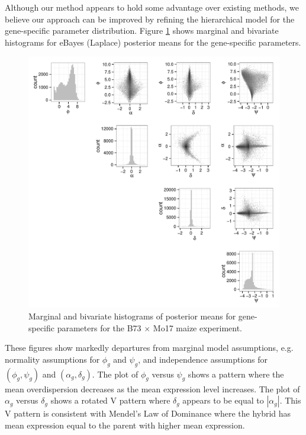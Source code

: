 \documentclass[useAMS,usenatbib,referee]{biom}
\begin{document}
Although our method appears to hold some advantage over existing methods, we believe our approach can be improved by refining the hierarchical model for the gene-specific parameter distribution. Figure \ref{f:scatterplot} shows marginal and bivariate histograms for eBayes (Laplace) posterior means for the gene-specific parameters. 
\begin{figure}
\centerline{\includegraphics[width=\textwidth]{estimates}}
\caption{Marginal and bivariate histograms of posterior means for gene-specific parameters for the B73 $\times$ Mo17 maize experiment.}
\label{f:scatterplot}
\end{figure}
These figures show markedly departures from marginal model assumptions, e.g. normality assumptions for $\phi_g$ and $\psi_g$, and independence assumptions for $(\phi_g,\psi_g)$ and $(\alpha_g,\delta_g)$. The plot of $\phi_g$ versus $\psi_g$ shows a pattern where the mean overdispersion decreases as the mean expression level increases. The plot of $\alpha_g$ versus $\delta_g$ shows a rotated V pattern where $\delta_g$ appears to be equal to $|\alpha_g|$. This V pattern is consistent with Mendel's Law of Dominance where the hybrid has mean expression equal to the parent with higher mean expression. 
\end{document}
